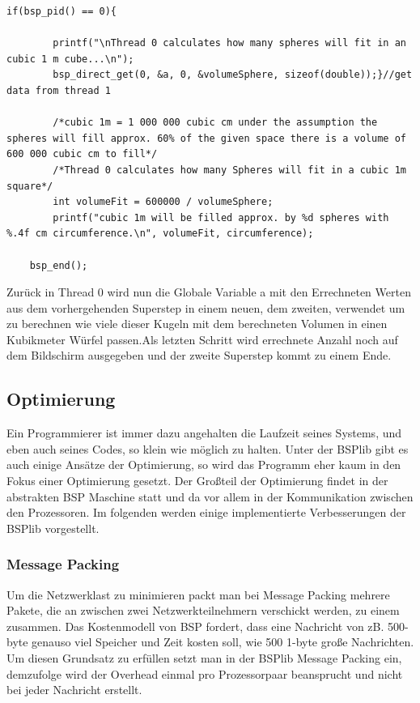 \documentclass[a4paper,10pt]{scrartcl}
\begin{document}
\begin{lstlisting}
if(bsp_pid() == 0){
    
	    printf("\nThread 0 calculates how many spheres will fit in an cubic 1 m cube...\n");                 
        bsp_direct_get(0, &a, 0, &volumeSphere, sizeof(double));}//get data from thread 1     
    
        /*cubic 1m = 1 000 000 cubic cm under the assumption the spheres will fill approx. 60% of the given space there is a volume of 600 000 cubic cm to fill*/
        /*Thread 0 calculates how many Spheres will fit in a cubic 1m square*/
        int volumeFit = 600000 / volumeSphere;
        printf("cubic 1m will be filled approx. by %d spheres with %.4f cm circumference.\n", volumeFit, circumference);
    
    bsp_end();
\end{lstlisting}
Zurück in Thread 0 wird nun die Globale Variable a mit den Errechneten Werten aus dem vorhergehenden Superstep in einem neuen, dem	 zweiten,  verwendet um zu berechnen wie viele dieser Kugeln mit dem berechneten Volumen in einen Kubikmeter Würfel passen.Als letzten Schritt wird errechnete Anzahl noch auf dem Bildschirm ausgegeben und der zweite Superstep kommt zu einem Ende.	
\newpage

\subsection{Optimierung}
Ein Programmierer ist immer dazu angehalten die Laufzeit seines Systems, und eben auch seines Codes, so klein wie möglich zu halten. Unter der BSPlib gibt es auch einige Ansätze der Optimierung, so wird das Programm eher kaum in den Fokus einer Optimierung gesetzt. Der Großteil der Optimierung findet in der abstrakten BSP Maschine statt und da vor allem in der Kommunikation zwischen den Prozessoren. Im folgenden werden einige implementierte Verbesserungen der BSPlib vorgestellt.

\subsubsection{Message Packing}
Um die Netzwerklast zu minimieren packt man bei Message Packing mehrere Pakete, die an zwischen zwei Netzwerkteilnehmern verschickt werden, zu einem zusammen. Das Kostenmodell von BSP fordert, dass eine Nachricht von zB. 500-byte genauso viel Speicher und Zeit kosten soll, wie 500 1-byte große Nachrichten. Um diesen Grundsatz zu erfüllen setzt man in der BSPlib Message Packing ein, demzufolge wird der Overhead einmal pro Prozessorpaar beansprucht und nicht bei jeder Nachricht erstellt.
\end{document}
